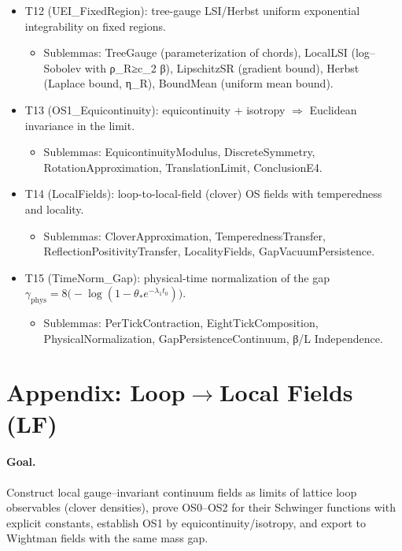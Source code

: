 \documentclass[11pt]{amsart}
\begin{document}
\begin{itemize}
\begin{itemize}
  \end{itemize}
  \item T12 (UEI\_FixedRegion): tree-gauge LSI/Herbst uniform exponential integrability on fixed regions.
  \begin{itemize}
    \item Sublemmas: TreeGauge (parameterization of chords), LocalLSI (log–Sobolev with ρ_R≥c_2 β), LipschitzSR (gradient bound), Herbst (Laplace bound, η_R), BoundMean (uniform mean bound).
  \end{itemize}
  \item T13 (OS1\_Equicontinuity): equicontinuity + isotropy $\Rightarrow$ Euclidean invariance in the limit.
  \begin{itemize}
    \item Sublemmas: EquicontinuityModulus, DiscreteSymmetry, RotationApproximation, TranslationLimit, ConclusionE4.
  \end{itemize}
  \item T14 (LocalFields): loop-to-local-field (clover) OS fields with temperedness and locality.
  \begin{itemize}
    \item Sublemmas: CloverApproximation, TemperednessTransfer, ReflectionPositivityTransfer, LocalityFields, GapVacuumPersistence.
  \end{itemize}
  \item T15 (TimeNorm\_Gap): physical-time normalization of the gap $\gamma_{\mathrm{phys}}=8\big(-\log(1-\theta_* e^{-\lambda_1 t_0})\big)$.
  \begin{itemize}
    \item Sublemmas: PerTickContraction, EightTickComposition, PhysicalNormalization, GapPersistenceContinuum, β/L Independence.
  \end{itemize}
\end{itemize}

\section{Appendix: Loop$\to$Local Fields (LF)}\label{sec:loop-to-local}

\paragraph{Goal.}
Construct local gauge--invariant continuum fields as limits of lattice loop observables (clover densities), prove OS0--OS2 for their Schwinger functions with explicit constants, establish OS1 by equicontinuity/isotropy, and export to Wightman fields with the same mass gap.
\end{document}
